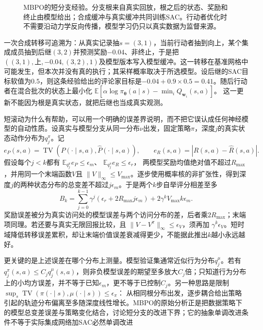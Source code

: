 \begin{figure}[t]
  \centering
  
  \caption{MBPO的短分支经验。分支根来自真实回放，根之后的状态、奖励和终止由模型给出；合成缓冲与真实缓冲共同训练SAC。行动者优化时不需要沿动力学反向传播，模型学习仍只以真实数据为监督来源。}
  \label{fig:rl-learning-mbpo}
\end{figure}

一次合成转移可追溯为：从真实记录抽$s=(3,1)$，当前行动者抽到向上，某个集成成员抽到后继$(3,2)$并预测奖励$-0.04$、非终止，于是把
$((3,1),\text{上},-0.04,(3,2),1)$及模型版本写入模型缓冲。这一转移在基准网格中可能发生，但本次并没有真的执行；其采样概率取决于所选模型。设后继的SAC目标软值为$0.5$，则这条经验给出的评论家目标是$-0.04+0.9\times0.5=0.41$。随后行动者在混合批次的状态上最小化
$\mathbb E[\alpha\log\pi_{\bm\theta}(a\mid s)-\min_iQ_{\bm w_i}(s,a)]$。
这一更新不能因为根是真实状态，就把后继也当成真实观测。

短滚动为什么有帮助，可以用一个明确的误差界说明，而不把它误认成任何神经模型的自动性质。设真实与模型分支从同一分布$\nu$出发，固定策略$\pi$，深度$j$的真实状态动作分布为$q_j^\pi$。记
\[
 e_P(s,a)=\operatorname{TV}(P(\cdot\mid s,a),\widehat P(\cdot\mid s,a)),
 \qquad e_R(s,a)=|R(s,a)-\widehat R(s,a)|.
\]
假设每个$j<k$都有
$\mathbb E_{q_j^\pi}e_P\leq\epsilon_m$、
$\mathbb E_{q_j^\pi}e_R\leq\epsilon_r$，
两模型奖励均值绝对值不超过$R_{\max}$，并用同一个末端函数$V$且
$\|V\|_\infty\leq V_{\max}$。逐步使用概率核的非扩张性，得到深度$j$的两种状态分布的总变差不超过$j\epsilon_m$。于是两个$k$步自举评分相差至多
\begin{equation}
 B_k=
   \sum_{j=0}^{k-1}\gamma^j
       (\epsilon_r+2R_{\max}j\epsilon_m)
       +2\gamma^kV_{\max}k\epsilon_m.
 \label{eq:rl-learning-short-model-bound}
\end{equation}
奖励误差被分为真实访问处的模型误差与两个访问分布的差，后者乘$2R_{\max}$；末端项同理。若还要与真实无限回报比较，且
$\|V-V^\pi\|_\infty\leq\epsilon_V$，须再加
$\gamma^k\epsilon_V$。短时域降低转移误差累积，却让末端价值误差衰减得更少，不能据此推出$k$越小永远越好。

更关键的是上述误差在哪个分布上测量。模型验证集通常近似行为分布$q_j^\mu$。若有
$q_j^\pi(s,a)\leq C_jq_j^\mu(s,a)$，则非负模型误差的期望至多放大$C_j$倍；只知道行为分布上的小均方误差，并不等于已知$\epsilon_m$，更不等于已控制$C_j$。另一种思路是限制
$\sup_s\operatorname{TV}(\pi(\cdot\mid s),\mu(\cdot\mid s))\leq\epsilon_\pi$：
从相同根分布出发，逐步耦合给出策略引起的轨迹分布偏离至多随深度线性增长。MBPO的原始分析正是把数据策略下的模型总变差误差与策略变化结合，讨论短分支的改进下界；它的抽象单调改进条件不等于实际集成网络加SAC必然单调改进

